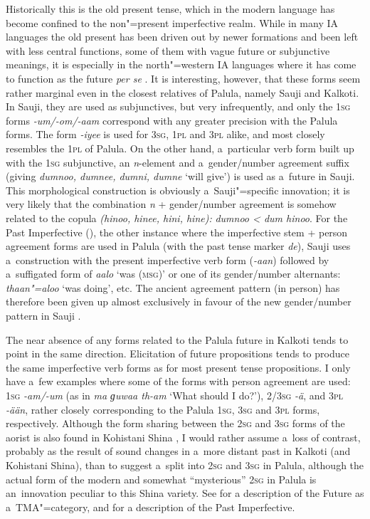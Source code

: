 Historically this is the old present tense, which in the modern language has become confined to the non"=present imperfective realm. While in many IA languages the old present has been driven out by newer formations and been left with less central functions, some of them with vague future or subjunctive meanings, it is especially in the north"=western IA languages where it has come to function as the future \textit{per se} \citep[288]{masica1991}. It is interesting, however, that these forms seem rather marginal even in the closest relatives of Palula, namely Sauji and Kalkoti. In Sauji, they are used as subjunctives, but very infrequently, and only the \textsc{1sg} forms \textit{-um/-om/-aam} correspond with any greater precision with the Palula forms. The form \textit{-iyee} is used for \textsc{3sg}, \textsc{1pl} and \textsc{3pl} alike, and most closely resembles the \textsc{1pl} of Palula. On the other hand, a~particular verb form built up with the \textsc{1sg} subjunctive, an \textit{n}-element and a~gender/number agreement suffix (giving \textit{dumnoo, dumnee, dumni, dumne} `will give') is used as a~future in Sauji. This morphological construction is obviously a~Sauji"=specific innovation; it is very likely that the combination \textit{n} + gender/number agreement is somehow related to the copula \textit{(hinoo, hinee, hini, hine):} \textit{dumnoo {\textless} dum hinoo}. For the Past Imperfective (), the other instance where the imperfective stem + person agreement forms are used in Palula (with the past tense marker \textit{de}), Sauji uses a~construction with the present imperfective verb form (\textit{-aan}) followed by a~suffigated form of \textit{aalo} `was \textsc{(msg)}' or one of its gender/number alternants: \textit{thaan"=aloo} `was doing', etc. The ancient agreement pattern (in person) has therefore been given up almost exclusively in favour of the new gender/number pattern in Sauji \citep[46--54]{buddruss1967}.



The near absence of any forms related to the Palula future in Kalkoti tends to point in the same direction. Elicitation of future propositions tends to produce the same imperfective verb forms as for most present tense propositions. I only have a~few examples where some of the forms with person agreement are used: \textsc{1sg} \textit{-am/-um} (as in \textit{ma ɡuwaa th-am} `What should I do?'), \textsc{2/3sg} \textit{-ä}, and \textsc{3pl} \textit{-ään}, rather closely corresponding to the Palula \textsc{1sg}, \textsc{3sg} and \textsc{3pl} forms, respectively. Although the form sharing between the \textsc{2sg} and \textsc{3sg} forms of the aorist is also found in Kohistani Shina \citep[39]{schmidt2004}, I would rather assume a~loss of contrast, probably as the result of sound changes in a~more distant past in Kalkoti (and Kohistani Shina), than to suggest a~split into \textsc{2sg} and \textsc{3sg} in Palula, although the actual form of the modern and somewhat ``mysterious'' \textsc{2sg} in Palula is an~innovation peculiar to this Shina variety. See  for a description of the Future as a~TMA"=category, and  for a description of the Past Imperfective.


